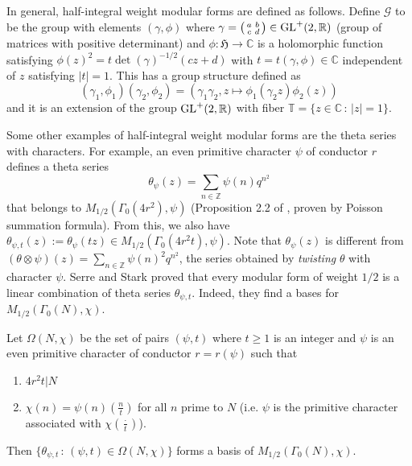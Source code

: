 In general, half-integral weight modular forms are defined as follows.
Define $\mathcal{G}$ to be the group with elements $(\gamma, \phi)$ where
$\gamma = \left(\begin{smallmatrix} a &b \\ c & d \end{smallmatrix}\right) \in \GL^{+}(2, \mathbb{R})$ 
(group of matrices with positive determinant) and
$\phi: \mathfrak{H} \to \mathbb{C}$ is a holomorphic function satisfying
$\phi(z)^{2} = t\det(\gamma)^{-1/2}(cz+d)$ with $t = t(\gamma, \phi)\in \mathbb{C}$
independent of $z$ satisfying $|t| = 1$.
This has a group structure defined as
$$
(\gamma_{1}, \phi_{1})(\gamma_{2}, \phi_{2}) = (\gamma_{1}\gamma_{2}, z\mapsto \phi_{1}(\gamma_{2}z)\phi_{2}(z))
$$
and it is an extension of the group $\operatorname{\mathrm{GL}}^{+}(2, \mathbb{R})$ with fiber $\mathbb{T} = \{z\in\mathbb{C}\,:\,|z| = 1\}$.

Some other examples of half-integral weight modular forms are the theta series with characters.
For example, an even primitive character $\psi$ of conductor $r$ defines a theta series
$$
\theta_{\psi}(z) = \sum_{n\in\mathbb{Z}} \psi(n)q^{n^{2}}
$$
that belongs to $M_{1/2}(\Gamma_{0}(4r^{2}), \psi)$ (Proposition 2.2 of \cite{shimura1973onmodular}, proven by Poisson summation formula).
From this, we also have $\theta_{\psi, t}(z):= \theta_{\psi}(tz) \in M_{1/2}(\Gamma_{0}(4r^{2}t), \psi)$.
Note that $\theta_{\psi}(z)$ is different from $(\theta \otimes \psi)(z) = \sum_{n\in \mathbb{Z}}\psi(n)^{2}q^{n^2}$,
the series obtained by \emph{twisting} $\theta$ with character $\psi$.
Serre and Stark proved that every modular form of weight $1/2$ is a linear combination of theta series $\theta_{\psi, t}$.
Indeed, they find a bases for $M_{1/2}(\Gamma_{0}(N), \chi)$.

\begin{theorem}
Let $\Omega(N, \chi)$ be the set of pairs $(\psi, t)$ where $t\geq 1$ is an integer and $\psi$ is an
even primitive character of conductor $r = r(\psi)$ such that
\begin{enumerate}
    \item $4r^{2}t | N$
    \item $\chi(n) = \psi(n)\left(\frac{n}{t}\right)$ for all $n$ prime to $N$ (i.e. $\psi$ is the primitive character
    associated with $\chi \left(\frac{\cdot}{t}\right)$).
\end{enumerate}
Then $\{\theta_{\psi, t}\,:\, (\psi, t) \in \Omega(N, \chi)\}$ forms a basis of $M_{1/2}(\Gamma_{0}(N), \chi)$.
\end{theorem}

